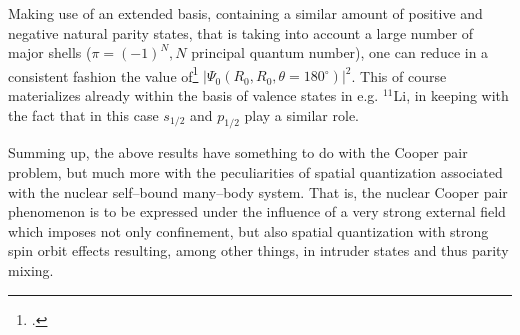 \begin{subappendices}
Making use of an extended basis, containing a similar amount of positive and negative natural parity states, that is taking into account a large number of major shells ($\pi=(-1)^N, N$ principal quantum number), one can reduce in a consistent fashion the value of\footnote{\cite{Ferreira:84}.} $|\Psi_0(R_0,R_0,\theta=180^\circ)|^2$.
This of course materializes already within the basis of valence states in e.g. $^{11}$Li, in keeping with the fact that in this case $s_{1/2}$ and $p_{1/2}$ play a similar role. 


Summing up, the above results have something to do with the Cooper pair problem, but much more with the peculiarities of spatial quantization associated with the nuclear self--bound many--body system. That is, the nuclear Cooper pair phenomenon  is to be expressed under the influence of a very strong external field which imposes not only confinement, but also spatial quantization with strong spin orbit effects resulting, among other things, in intruder states and thus parity mixing.   

\end{subappendices}
